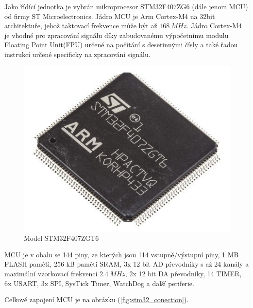 Jako řídící jednotka je vybrán mikroprocesor STM32F407ZG6 (dále jenom MCU) od firmy ST Microelectronics.
Jádro MCU je Arm Cortex-M4 na 32bit architektuře, jehož taktovací frekvence může být až $168 \ MHz$. Jádro Cortex-M4 je vhodné pro zpracování signálu díky zabudovanému výpočetnímu modulu Floating Point Unit(FPU) určené na
počítání s desetinnými čísly a také řadou instrukcí určené specificky na zpracování signálu.
\begin{figure}[H]
    \centering
    \includegraphics[width=0.5\linewidth]{pictures/stm32f407.jpg}
    \caption{Model STM32F407ZGT6 \cite{cite:STM32F407}}
    \label{fig:stm32}
\end{figure}
MCU je v obalu se 144 piny, ze kterých jsou 114 vstupně/výstupní piny, 1 MB FLASH paměti, 256 kB paměti SRAM, 3x 12 bit AD převodníky s až 24 kanály a maximální vzorkovací frekvencí $2.4 \ MHz$,
2x 12 bit DA převodníky, 14 TIMER, 6x USART, 3x SPI, SysTick Timer, WatchDog a další periferie.
\par
Celkové zapojení MCU je na obrázku (\ref{fig:stm32_conection}).

